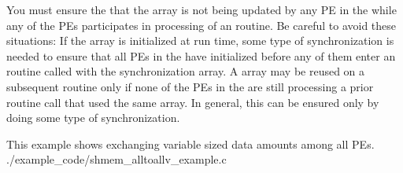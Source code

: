\begin{apidefinition}
{    You must ensure the that the  array is not being updated by any
    \ac{PE} in the \activeset{} while any of the \acp{PE} participates in
    processing of an \openshmem {} routine. Be careful to
    avoid these situations: If the  array is initialized at run
    time, some type of synchronization is needed to ensure that all \acp{PE} in
    the \activeset{} have initialized  before any of them enter an
    \openshmem routine called with the  synchronization array.  A
     array may be reused on a subsequent \openshmem
     routine only if none of the \acp{PE} in the
    \activeset{} are still processing a prior \openshmem
     routine call that used the same  array.
    In general, this can be ensured only by doing some type of synchronization.        
}

\begin{apiexamples}

\apicexample
    {This example shows  exchanging variable sized
    data amounts among all \acp{PE}.}
    {./example_code/shmem_alltoallv_example.c}
    {}

\end{apiexamples}

\end{apidefinition}
